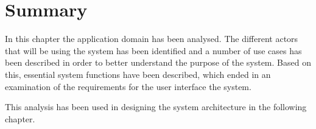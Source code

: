 \section{Summary} \label{ssc:ad_summary}
In this chapter the application domain has been analysed. The different actors that will be using the system has been identified and a number of use cases has been described in order to better understand the purpose of the system. Based on this, essential system functions have been described, which ended in an examination of the requirements for the user interface the system. 
\par
This analysis has been used in designing the system architecture in the following chapter.